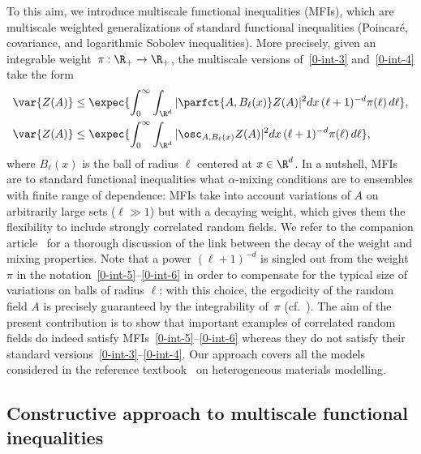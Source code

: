 To this aim, we introduce multiscale functional inequalities (MFIs), which are multiscale weighted generalizations of standard functional inequalities (Poincaré, covariance, and logarithmic Sobolev inequalities). More precisely, given an integrable weight~$\pi:\R_+\to \R_+$, the multiscale versions of~\eqref{0-int-3} and~\eqref{0-int-4} take the form
\begin{align}
\var{Z(A)} &\le \expec{\int_0^\infty \int_{\R^d} |\parfct{A,B_\ell(x)} Z(A)|^2dx\, (\ell+1)^{-d}\pi(\ell)\,d\ell},\label{0-int-5}
\\
\var{Z(A)} &\le \expec{ \int_0^\infty \int_{\R^d}|\osc_{A,B_\ell(x)} Z(A)|^2dx\, (\ell+1)^{-d}\pi(\ell)\,d\ell},\label{0-int-6}
\end{align}
where $B_\ell(x)$ is the ball of radius $\ell$ centered at $x\in \R^d$. In a nutshell, MFIs are to standard functional inequalities what $\alpha$-mixing conditions are to ensembles with finite range of dependence: MFIs take into account variations of $A$ on arbitrarily large sets ($\ell\gg 1$) but with a decaying weight, which gives them the flexibility to include strongly correlated random fields. We refer to the companion article~\cite{DG1} for a thorough discussion of the link between the decay of the weight and mixing properties. Note that a power $(\ell+1)^{-d}$ is singled out from the weight $\pi$ in the notation~\eqref{0-int-5}--\eqref{0-int-6} in order to compensate for the typical size of variations on balls of radius $\ell$: with this choice, the ergodicity of the random field $A$ is precisely guaranteed by the integrability of~$\pi$ (cf.~\cite[Proposition~1.4]{DG1}). The aim of the present contribution is to show that important examples of correlated random fields do indeed satisfy MFIs~\eqref{0-int-5}--\eqref{0-int-6} whereas they do not satisfy their standard versions~\eqref{0-int-3}--\eqref{0-int-4}. Our approach covers all the models considered in the reference textbook~\cite{Torquato-02} on heterogeneous materials modelling.


\subsection{Constructive approach to multiscale functional inequalities}


